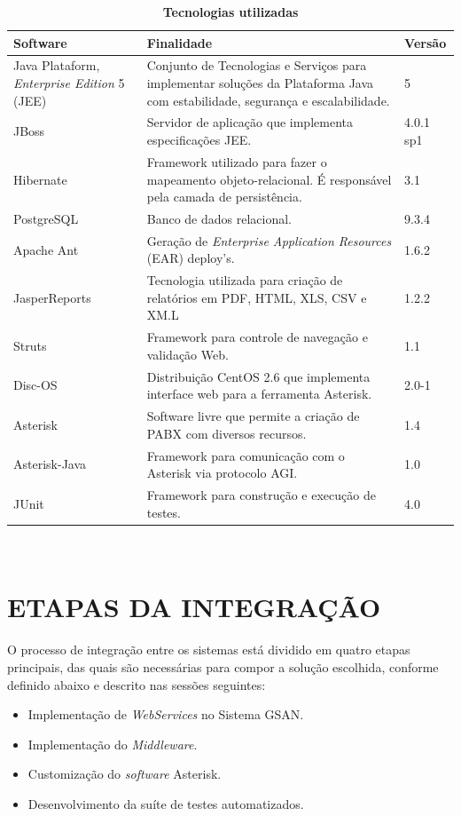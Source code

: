\begin{table}[H]
	\footnotesize
	\caption{\textbf{Tecnologias utilizadas}}
	\label{tabela:tecnologiasUtilizadas}
	\begin{tabular}{|p{4cm}|p{7cm}|p{2cm}|}
		\hline
		\textbf{Software} & \textbf{Finalidade} & \textbf{Versão} \\
		\hline
		Java Plataform, \textit{Enterprise Edition} 5 (JEE) & Conjunto de Tecnologias e Serviços para implementar soluções da Plataforma Java com estabilidade, segurança e escalabilidade. & 5 \\
		\hline
		JBoss 				& Servidor de aplicação que implementa especificações JEE. 								& 4.0.1 sp1 \\
		\hline
		Hibernate 			& Framework utilizado para fazer o mapeamento objeto-relacional. É responsável pela camada de persistência. & 3.1 \\
		\hline
		PostgreSQL 			& Banco de dados relacional. 															& 9.3.4 \\
		\hline
		Apache Ant 			& Geração de \textit{Enterprise Application Resources} (EAR) deploy’s. 					& 1.6.2 \\
		\hline
		JasperReports 		& Tecnologia utilizada para criação de relatórios em PDF, HTML, XLS, CSV e XM.L 		& 1.2.2 \\
		\hline
		Struts 				& Framework para controle de navegação e validação Web. 								& 1.1	 \\
		\hline
		Disc-OS 			& Distribuição CentOS 2.6 que implementa interface web para a ferramenta Asterisk. 		& 2.0-1 \\
		\hline
		Asterisk 			& Software livre que permite a criação de PABX com diversos recursos. 					& 1.4 \\		
		\hline
		Asterisk-Java 		& Framework para comunicação com o Asterisk via protocolo AGI. 							& 1.0 \\
		\hline
		JUnit		 		& Framework para construção e execução de testes. 										& 4.0 \\		
		\hline			
	\end{tabular}\\[6pt]
	\fontsize{10}{12}\selectfont {Fonte: Autoria Própria.}
\end{table}



\section{\textbf{\uppercase{Etapas da Integração}}}
O processo de integração entre os sistemas está dividido em quatro etapas principais, das quais são necessárias para compor a solução escolhida, conforme definido abaixo e descrito nas sessões seguintes:

\begin{itemize}
	\item Implementação de \textit{WebServices} no Sistema GSAN. 
	\item Implementação do \textit{Middleware}.
	\item Customização do \textit{software} Asterisk.
	\item Desenvolvimento da suíte de testes automatizados.
\end{itemize}
